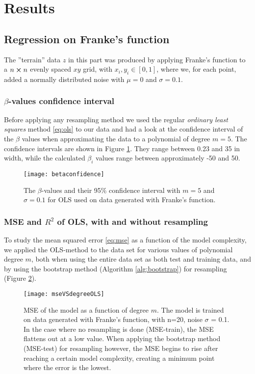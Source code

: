 \section{Results}
\label{sec:results}
\subsection{Regression on Franke's function}
The {''}terrain'' data $z$ in this part was produced by applying Franke's function to a $n\cross n$ evenly spaced $xy$ grid, with $x_i,y_i\in [0,1]$, where we, for each point, added a normally distributed noise with $\mu = 0$ and $\sigma = 0.1$.
\subsubsection{$\beta$-values confidence interval}
Before applying any resampling method we used the regular \emph{ordinary least squares} method \eqref{eq:ols} to our data and had a look at the confidence interval of the $\beta$ values when approximating the data to a polynomial of degree $m=5$. The confidence intervals are shown in Figure \ref{fig:betaconfidence}.
They range between 0.23 and 35 in width, while the calculated $\beta_i$ values range between approximately -50 and 50.
\begin{figure}[htbp]
	\centering
	\texttt{[image: betaconfidence]}
	\caption{The $\beta$-values and their 95\% confidence interval with $m=5$ and $\sigma=0.1$ for OLS used on data generated with Franke's function.}
	\label{fig:betaconfidence}
\end{figure}

\subsubsection{MSE and $R^2$ of OLS, with and without resampling}
To study the mean squared error \eqref{eq:mse} as a function of the model complexity, we applied the OLS-method to the data set for various values of polynomial degree $m$, both when using the entire data set as both test and training data, and by using the bootstrap method (Algorithm \ref{alg:bootstrap}) for resampling (Figure \ref{fig:mseVSdegreeOLS}).

\begin{figure}[htbp]
	\centering
	\texttt{[image: mseVSdegreeOLS]}
	\caption{MSE of the model as a function of degree $m$. The model is trained on data generated with Franke's function, with n=20, noise $\sigma$ = 0.1. In the case where no resampling is done (MSE-train), the MSE flattens out at a low value. When applying the bootstrap method (MSE-test) for resampling however, the MSE begins to rise after reaching a certain model complexity, creating a minimum point where the error is the lowest.}
	\label{fig:mseVSdegreeOLS}
\end{figure}

